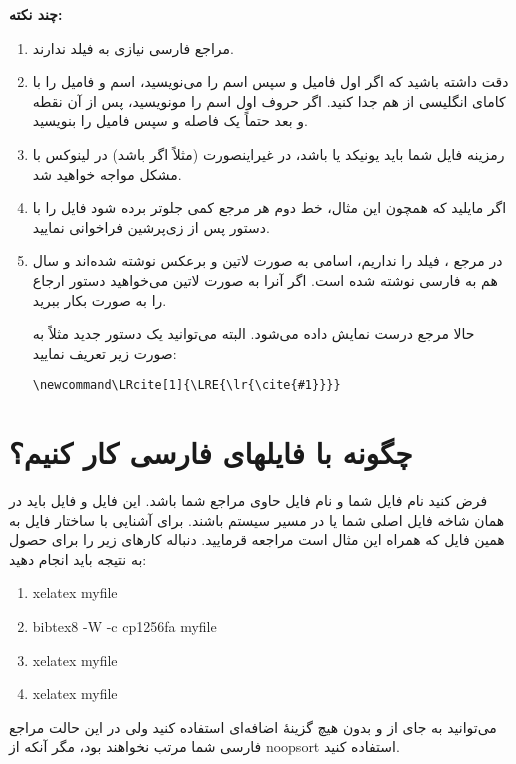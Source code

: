 \documentclass{article} %
\begin{document}
{\bf چند نکته:}
\begin{enumerate}
\item مراجع فارسی نیازی به فیلد  ندارند.
\item دقت داشته باشید که اگر اول فامیل و سپس اسم را می‌نویسید، اسم و فامیل را با کامای انگلیسی از هم جدا کنید. اگر حروف اول اسم را مونویسید، پس از آن نقطه و بعد حتماً یک فاصله و سپس فامیل را بنویسید.
\item رمزینه فایل  شما باید یونیکد یا  باشد، در غیراینصورت (مثلاً اگر   باشد) در لینوکس با مشکل مواجه خواهید شد.
\item اگر مایلید که همچون این مثال، خط دوم هر مرجع کمی جلوتر برده شود فایل  را با دستور  پس از زی‌پرشین فراخوانی نمایید.
\item در مرجع \cite{Baker02limits}،  فیلد  را نداریم، اسامی به صورت لاتین و برعکس نوشته شده‌اند و سال هم به فارسی نوشته شده است. اگر آنرا به صورت لاتین می‌خواهید دستور ارجاع را به صورت  بکار ببرید.

 حالا مرجع  درست نمایش داده می‌شود. البته می‌توانید یک دستور جدید مثلاً به صورت زیر تعریف نمایید:
\begin{latin}
\begin{verbatim}
\newcommand\LRcite[1]{\LRE{\lr{\cite{#1}}}}
\end{verbatim}
\end{latin}

\end{enumerate}

\appendix
\section{چگونه با فایلهای  فارسی کار کنیم؟}
فرض کنید نام فایل شما  و نام فایل حاوی مراجع شما  باشد. این فایل و فایل  باید در همان شاخه فایل اصلی شما یا در مسیر سیستم باشند. برای آشنایی با ساختار فایل  به همین فایل که همراه این مثال است مراجعه قرمایید. دنباله کارهای زیر را برای حصول به نتیجه باید انجام دهید:
\begin{latin}
\begin{enumerate}
\item xelatex myfile
\item bibtex8 -W -c cp1256fa myfile
\item xelatex myfile
\item xelatex myfile
\end{enumerate}
\end{latin}
می‌توانید به جای  از {}  و بدون هیچ گزینهٔ اضافه‌ای استفاده کنید ولی در این حالت مراجع فارسی شما مرتب نخواهند بود، مگر آنکه از {noopsort} استفاده کنید.
\end{document}
